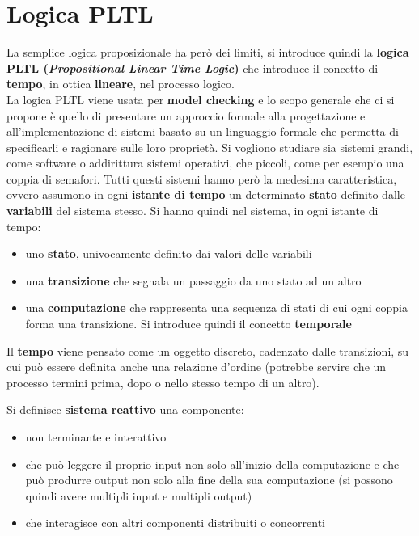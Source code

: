 \documentclass[a4paper,12pt, oneside]{book}
\begin{document}
\section{Logica PLTL}
La semplice logica proposizionale ha però dei limiti, si introduce quindi la
\textbf{logica PLTL (\textit{Propositional Linear Time Logic})} che introduce il
concetto di \textbf{tempo}, in ottica \textbf{lineare}, nel processo logico.\\
La logica PLTL viene usata per \textbf{model checking} e lo scopo generale che
ci si propone è quello di presentare un approccio formale alla progettazione e
all'implementazione di sistemi basato su un linguaggio formale che permetta di
specificarli e ragionare sulle loro proprietà. Si vogliono studiare sia sistemi
grandi, come software o addirittura sistemi operativi, che piccoli, come per
esempio una coppia di semafori. Tutti questi sistemi hanno però la medesima
caratteristica, ovvero assumono in ogni \textbf{istante di tempo} un determinato
\textbf{stato} definito dalle \textbf{variabili} del sistema stesso. Si hanno
quindi nel sistema, in ogni istante di tempo:
\begin{itemize}
  \item uno \textbf{stato}, univocamente definito dai valori delle variabili
  \item una \textbf{transizione} che segnala un passaggio da uno stato ad un
  altro
  \item una \textbf{computazione} che rappresenta una sequenza di stati di cui
  ogni coppia forma una transizione. Si introduce quindi il concetto
  \textbf{temporale} 
\end{itemize}
Il \textbf{tempo} viene pensato come un oggetto discreto, cadenzato dalle
transizioni, su cui può essere definita anche una relazione d'ordine (potrebbe
servire che un processo termini prima, dopo o nello stesso tempo di un altro).
\begin{definizione}
  Si definisce \textbf{sistema reattivo} una componente:
  \begin{itemize}
    \item non terminante e interattivo
    \item che può leggere il proprio input non solo all'inizio della
    computazione e che può produrre output non solo alla fine della sua
    computazione (si possono quindi avere multipli input e multipli output)
    \item che interagisce con altri componenti distribuiti o concorrenti
  \end{itemize}
\end{definizione}
\end{document}
